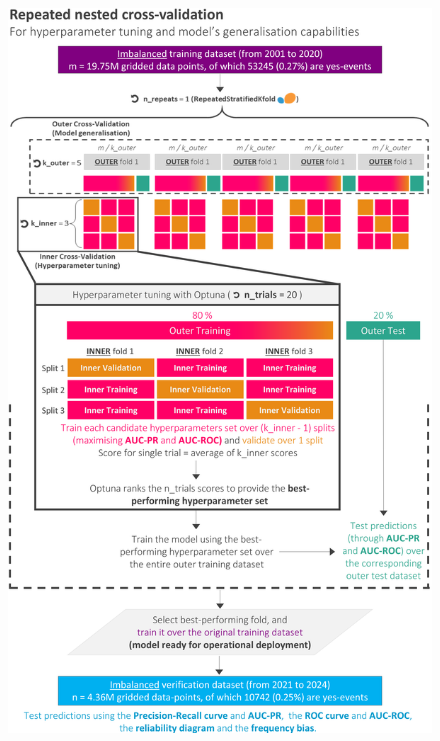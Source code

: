 \begin{figure}[htbp]
\centering
\includegraphics[scale=0.8]{chapter_06/figures/cv_optuna.png}

\end{figure}
